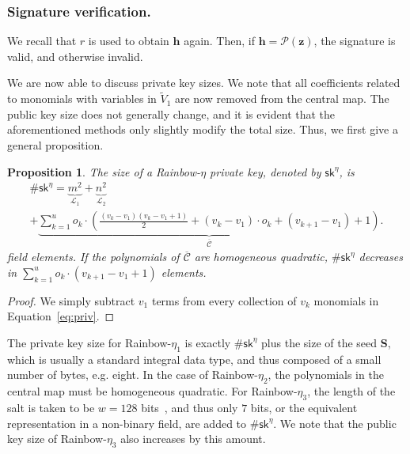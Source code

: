 \documentclass[12pt, a4paper, oneside]{memoir}
\newtheorem{proposition}[theorem]{Proposition}
\theoremstyle{definition}
\begin{document}
\subsubsection{Signature verification.}

We recall that $r$ is used to obtain $\mathbf{h}$ again. Then, if $\mathbf{h} = \mathcal{P}(\mathbf{z})$, the signature is valid, and otherwise invalid.

\vspace{4mm}\noindent
We are now able to discuss private key sizes. We note that all coefficients related to monomials with variables in $\widetilde{V}_{1}$ are now removed from the central map. The public key size does not generally change, and it is evident that the aforementioned methods only slightly modify the total size. Thus, we first give a general proposition.

\begin{proposition}
  The size of a Rainbow-$\eta$ private key, denoted by $\mathsf{sk}^{\eta}$, is
  \begin{multline}
  \#\mathsf{sk}^{\eta} = \underbrace{m^{2}}_{\mathcal{L}_{1}}
    + \underbrace{n^{2}}_{\mathcal{L}_{2}} \\
    + \underbrace{\sum_{k = 1}^{u} o_{k} \cdot \left( \frac{(v_{k} - v_{1})(v_{k} - v_{1} + 1)}{2}
      + (v_{k} - v_{1}) \cdot o_{k} + (v_{k + 1} - v_{1}) + 1 \right)}_{\overline{\mathcal{C}}}.
  \end{multline}
  field elements. If the polynomials of $\overline{\mathcal{C}}$ are homogeneous quadratic, $\#\mathsf{sk}^{\eta}$ decreases in $\sum_{k = 1}^{u} o_{k} \cdot (v_{k + 1} - v_{1} + 1)$ elements.
\end{proposition}
\begin{proof}
  We simply subtract $v_{1}$ terms from every collection of $v_{k}$ monomials in Equation~\ref{eq:priv}.
\end{proof}

The private key size for Rainbow-$\eta_{1}$ is exactly $\#\mathsf{sk}^{\eta}$ plus the size of the seed $\mathbf{S}$, which is usually a standard integral data type, and thus composed of a small number of bytes, e.g. eight. In the case of Rainbow-$\eta_{2}$, the polynomials in the central map must be homogeneous quadratic. For Rainbow-$\eta_{3}$, the length of the salt is taken to be $w = 128$ bits~\cite[p.~11]{Ding:201901}, and thus only $7$ bits, or the equivalent representation in a non-binary field, are added to $\#\mathsf{sk}^{\eta}$. We note that the public key size of Rainbow-$\eta_{3}$ also increases by this amount.
\end{document}
